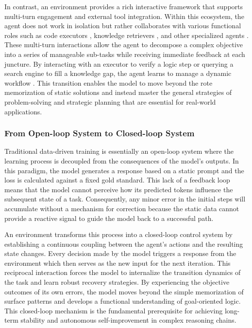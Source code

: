 In contrast, an environment provides a rich interactive framework that supports multi-turn engagement and external tool integration. Within this ecosystem, the agent does not work in isolation but rather collaborates with various functional roles such as code executors \cite{SWE-Bench, Terminal-Bench, IDE-Bench}, knowledge retrievers \cite{WideSearch,BrowseComp,GAIA}, and other specialized agents \cite{RoboFactory, LLMARENA, unlocking_future, MCPVerse}. These multi-turn interactions allow the agent to decompose a complex objective into a series of manageable sub-tasks while receiving immediate feedback at each juncture. By interacting with an executor to verify a logic step or querying a search engine to fill a knowledge gap, the agent learns to manage a dynamic workflow \cite{AutoFlow, MUSE, AgentFlow}. This transition enables the model to move beyond the rote memorization of static solutions and instead master the general strategies of problem-solving and strategic planning that are essential for real-world applications.

\subsubsection{From Open-loop System to Closed-loop System}
Traditional data-driven training is essentially an open-loop system where the learning process is decoupled from the consequences of the model's outputs. In this paradigm, the model generates a response based on a static prompt and the loss is calculated against a fixed gold standard. This lack of a feedback loop means that the model cannot perceive how its predicted tokens influence the subsequent state of a task. Consequently, any minor error in the initial steps will accumulate without a mechanism for correction because the static data cannot provide a reactive signal to guide the model back to a successful path.

An environment transforms this process into a closed-loop control system by establishing a continuous coupling between the agent's actions and the resulting state changes. Every decision made by the model triggers a response from the environment which then serves as the new input for the next iteration. This reciprocal interaction forces the model to internalize the transition dynamics of the task and learn robust recovery strategies. By experiencing the objective outcomes of its own errors, the model moves beyond the simple memorization of surface patterns and develops a functional understanding of goal-oriented logic. This closed-loop mechanism is the fundamental prerequisite for achieving long-term stability and autonomous self-improvement in complex reasoning chains.

